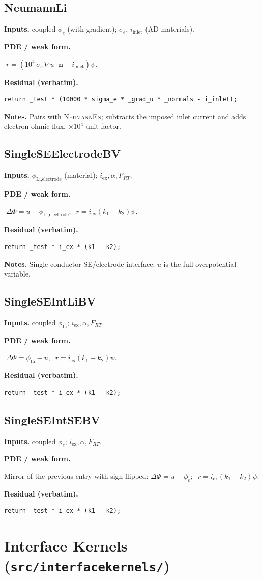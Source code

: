 \documentclass[11pt]{article}
\newcommand{\nvec}{\mathbf{n}}
\newenvironment{ecmEntry}[1]{%
  \subsection{#1}%
}{}
\newcommand{\inputsRow}[1]{\par\noindent\textbf{Inputs.} #1\par}
\newcommand{\pdeRow}[1]{\par\noindent\textbf{PDE / weak form.}\par #1\par}
\newcommand{\codeRow}{\par\noindent\textbf{Residual (verbatim).}\par}
\newcommand{\notesRow}[1]{\par\noindent\textbf{Notes.} #1\par}
\begin{document}
\begin{ecmEntry}{NeumannLi}
\inputsRow{coupled $\phi_e$ (with gradient); $\sigma_e$, $i_{\text{inlet}}$ (AD materials).}
\pdeRow{$\;r = (10^4\,\sigma_e\,\nabla u\!\cdot\!\nvec - i_{\text{inlet}})\psi$.}
\codeRow\begin{lstlisting}
return _test * (10000 * sigma_e * _grad_u * _normals - i_inlet);
\end{lstlisting}
\notesRow{Pairs with \textsc{NeumannEn}; subtracts the imposed inlet current and adds
electron ohmic flux. $\times 10^4$ unit factor.}
\end{ecmEntry}

\begin{ecmEntry}{SingleSEElectrodeBV}
\inputsRow{$\phi_{\text{Li,electrode}}$ (material); $i_{\text{ex}},\alpha,F_{RT}$.}
\pdeRow{$\;\Delta\Phi = u-\phi_{\text{Li,electrode}};\;\; r = i_{\text{ex}}(k_1-k_2)\psi$.}
\codeRow\begin{lstlisting}
return _test * i_ex * (k1 - k2);
\end{lstlisting}
\notesRow{Single-conductor SE/electrode interface; $u$ is the full overpotential variable.}
\end{ecmEntry}

\begin{ecmEntry}{SingleSEIntLiBV}
\inputsRow{coupled $\phi_{\text{Li}}$; $i_{\text{ex}},\alpha,F_{RT}$.}
\pdeRow{$\;\Delta\Phi = \phi_{\text{Li}}-u;\;\; r = i_{\text{ex}}(k_1-k_2)\psi$.}
\codeRow\begin{lstlisting}
return _test * i_ex * (k1 - k2);
\end{lstlisting}
\end{ecmEntry}

\begin{ecmEntry}{SingleSEIntSEBV}
\inputsRow{coupled $\phi_e$; $i_{\text{ex}},\alpha,F_{RT}$.}
\pdeRow{Mirror of the previous entry with sign flipped:
$\Delta\Phi = u-\phi_e;\;\;r=i_{\text{ex}}(k_1-k_2)\psi$.}
\codeRow\begin{lstlisting}
return _test * i_ex * (k1 - k2);
\end{lstlisting}
\end{ecmEntry}

\section{Interface Kernels (\texttt{src/interfacekernels/})}
\end{document}
